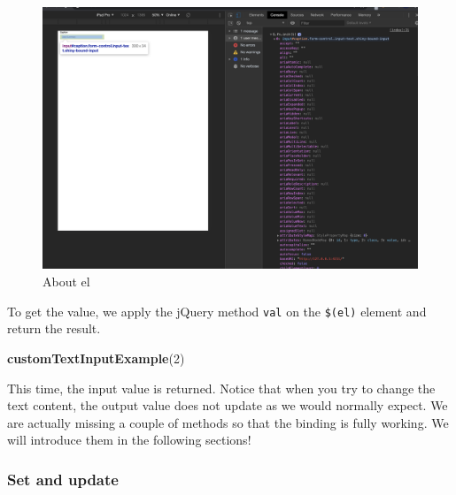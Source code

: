 \documentclass[
]{book}
\newenvironment{Shaded}{\begin{snugshade}}{\end{snugshade}}
\newcommand{\AttributeTok}[1]{\textcolor[rgb]{0.77,0.63,0.00}{#1}}
\newcommand{\ControlFlowTok}[1]{\textcolor[rgb]{0.13,0.29,0.53}{\textbf{#1}}}
\newcommand{\DecValTok}[1]{\textcolor[rgb]{0.00,0.00,0.81}{#1}}
\newcommand{\KeywordTok}[1]{\textcolor[rgb]{0.13,0.29,0.53}{\textbf{#1}}}
\newcommand{\NormalTok}[1]{#1}
\newcommand{\OperatorTok}[1]{\textcolor[rgb]{0.81,0.36,0.00}{\textbf{#1}}}
\newcommand{\VariableTok}[1]{\textcolor[rgb]{0.00,0.00,0.00}{#1}}
\begin{document}
\begin{figure}
\includegraphics[width=35.5in]{images/survival-kit/shiny-el} \caption{About el}\label{fig:shiny-el}
\end{figure}

\begin{Shaded}
\end{Shaded}

To get the value, we apply the jQuery method \texttt{val} on the \texttt{\$(el)} element and return the result.

\begin{Shaded}
\begin{Highlighting}[]
\KeywordTok{customTextInputExample}\NormalTok{(}\DecValTok{2}\NormalTok{)}
\end{Highlighting}
\end{Shaded}

This time, the input value is returned. Notice that when you try to change the text content, the output value does not update as we would normally expect. We are actually missing a couple of methods so that the binding is fully working. We will introduce them in the following sections!

\hypertarget{set-and-update}{%
\subsubsection{Set and update}\label{set-and-update}}
\end{document}
